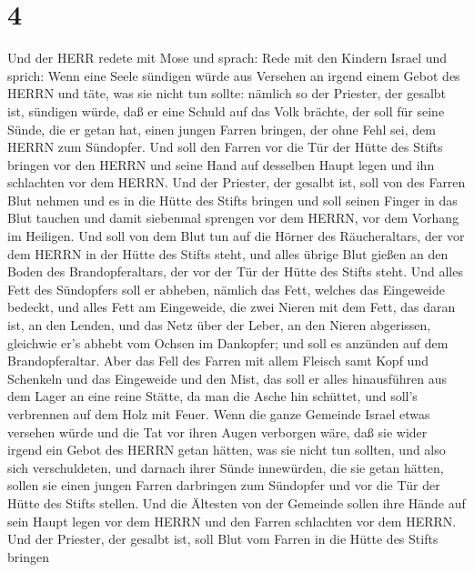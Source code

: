 \hypertarget{section-3}{%
\section{4}\label{section-3}}

 Und der HERR redete mit Mose und sprach:  Rede
mit den Kindern Israel und sprich: Wenn eine Seele sündigen würde aus
Versehen an irgend einem Gebot des HERRN und täte, was sie nicht tun
sollte:  nämlich so der Priester, der gesalbt ist, sündigen
würde, daß er eine Schuld auf das Volk brächte, der soll für seine
Sünde, die er getan hat, einen jungen Farren bringen, der ohne Fehl sei,
dem HERRN zum Sündopfer.  Und soll den Farren vor die Tür
der Hütte des Stifts bringen vor den HERRN und seine Hand auf desselben
Haupt legen und ihn schlachten vor dem HERRN.  Und der
Priester, der gesalbt ist, soll von des Farren Blut nehmen und es in die
Hütte des Stifts bringen  und soll seinen Finger in das Blut
tauchen und damit siebenmal sprengen vor dem HERRN, vor dem Vorhang im
Heiligen.  Und soll von dem Blut tun auf die Hörner des
Räucheraltars, der vor dem HERRN in der Hütte des Stifts steht, und
alles übrige Blut gießen an den Boden des Brandopferaltars, der vor der
Tür der Hütte des Stifts steht.  Und alles Fett des
Sündopfers soll er abheben, nämlich das Fett, welches das Eingeweide
bedeckt, und alles Fett am Eingeweide,  die zwei Nieren mit
dem Fett, das daran ist, an den Lenden, und das Netz über der Leber, an
den Nieren abgerissen,  gleichwie er's abhebt vom Ochsen im
Dankopfer; und soll es anzünden auf dem Brandopferaltar. 
Aber das Fell des Farren mit allem Fleisch samt Kopf und Schenkeln und
das Eingeweide und den Mist,  das soll er alles
hinausführen aus dem Lager an eine reine Stätte, da man die Asche hin
schüttet, und soll's verbrennen auf dem Holz mit Feuer. 
Wenn die ganze Gemeinde Israel etwas versehen würde und die Tat vor
ihren Augen verborgen wäre, daß sie wider irgend ein Gebot des HERRN
getan hätten, was sie nicht tun sollten, und also sich verschuldeten,
 und darnach ihrer Sünde innewürden, die sie getan hätten,
sollen sie einen jungen Farren darbringen zum Sündopfer und vor die Tür
der Hütte des Stifts stellen.  Und die Ältesten von der
Gemeinde sollen ihre Hände auf sein Haupt legen vor dem HERRN und den
Farren schlachten vor dem HERRN.  Und der Priester, der
gesalbt ist, soll Blut vom Farren in die Hütte des Stifts bringen
